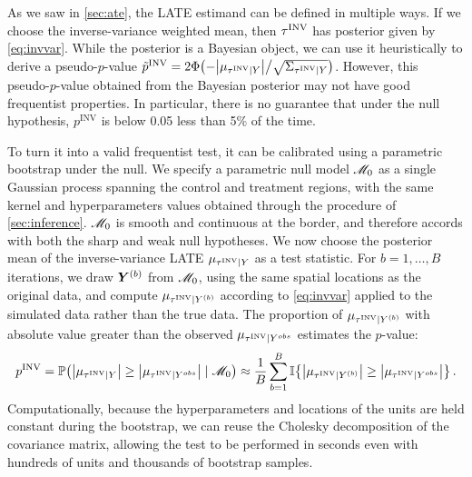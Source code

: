 As we saw in \autoref{sec:ate}, the LATE estimand can be defined in multiple ways.
If we choose the inverse-variance weighted mean, then \(\tau^{\mathrm{INV}}\) has posterior given by \autoref{eq:invvar}.
While the posterior is a Bayesian object, we can use it heuristically to derive a pseudo-\(p\)-value
\(
	\tilde{p}^{\mathrm{INV}} 
        = 2\Phi\del{-
            \abs{
                \mu_{
                    \invvar \mid Y
                }
            }
            \big/
            \sqrt{
                \Sigma_{\invvar \mid Y}
            }
    }
\).
However, this pseudo-\(p\)-value obtained from the Bayesian posterior may not have good frequentist properties.
In particular, there is no guarantee that under the null hypothesis, \(p^{\mathrm{INV}}\) is below 0.05 less than 5\% of the time.

To turn it into a valid frequentist test, it can be calibrated using a parametric bootstrap under the null.
We specify a parametric null model \(\mathscr{M}_0\)
as a single Gaussian process spanning the control and treatment regions,
with the same kernel and hyperparameters values obtained through the procedure of \autoref{sec:inference}.
\(\mathscr{M}_0\) is smooth and continuous at the border,
and therefore accords with both the sharp and weak null hypotheses.
We now choose the posterior mean of the inverse-variance LATE \(\mu_{\tau^{\mathrm{INV}} \mid Y}\) as a test statistic.
For \(b=1,\dotsc,B\) iterations, we draw \(\bm{Y}^{(b)}\) from \(\mathscr{M}_0\),
using the same spatial locations as the original data,
and compute \(\mu_{\tau^{\mathrm{INV}} \mid Y^{(b)}}\) according to \autoref{eq:invvar} applied to the simulated data rather than the true data.
The proportion of \(\mu_{\tau^{\mathrm{INV}} \mid Y^{(b)}}\) with absolute value greater than the observed \(\mu_{\tau^{\mathrm{INV}} \mid Y^{obs}}\) estimates the \(p\)-value:
\begin{equation}
    p^{\mathrm{INV}} = \Pr\del{ \abs{\mu_{\invvar \mid Y}} \ge \abs{\mu_{\invvar \mid Y^{obs}}} \mid \modnull} 
    \approx \frac{1}{B} 
    \sum_{b=1}^B 
        \Ind\cbr{
            \abs{
                \mu_{\invvar \mid Y^{(b)}}
            } 
            \ge  
            \abs{
                \mu_{\invvar \mid Y^{obs}}
            } 
        }
    \,.
\end{equation}
Computationally, because the hyperparameters and locations of the units are held constant during the bootstrap, we can reuse the Cholesky decomposition of the covariance matrix, allowing the test to be performed in seconds even with hundreds of units and thousands of bootstrap samples.

